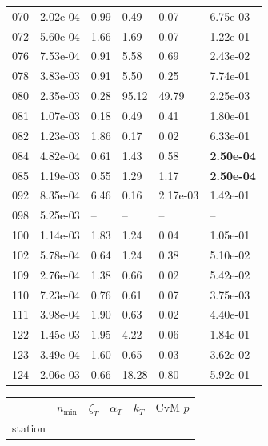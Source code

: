 \begin{figure}[htbp!]
{\begin{minipage}[t]{0.48\linewidth}
\begin{tabular}{llllll}
                    070 & 2.02e-04 & 0.99 & 0.49 & 0.07 & 6.75e-03\\
                    072 & 5.60e-04 & 1.66 & 1.69 & 0.07 & 1.22e-01\\
                    076 & 7.53e-04 & 0.91 & 5.58 & 0.69 & 2.43e-02\\
                    078 & 3.83e-03 & 0.91 & 5.50 & 0.25 & 7.74e-01\\
                    080 & 2.35e-03 & 0.28 & 95.12 & 49.79 & 2.25e-03\\
                    081 & 1.07e-03 & 0.18 & 0.49 & 0.41 & 1.80e-01\\
                    082 & 1.23e-03 & 1.86 & 0.17 & 0.02 & 6.33e-01\\
                    084 & 4.82e-04 & 0.61 & 1.43 & 0.58 & \textbf{2.50e-04}\\
                    085 & 1.19e-03 & 0.55 & 1.29 & 1.17 & \textbf{2.50e-04}\\
                    092 & 8.35e-04 & 6.46 & 0.16 & 2.17e-03 & 1.42e-01\\
                    098 & 5.25e-03 & -- & -- & -- & --\\
                    100 & 1.14e-03 & 1.83 & 1.24 & 0.04 & 1.05e-01\\
                    102 & 5.78e-04 & 0.64 & 1.24 & 0.38 & 5.10e-02\\
                    109 & 2.76e-04 & 1.38 & 0.66 & 0.02 & 5.42e-02\\
                    110 & 7.23e-04 & 0.76 & 0.61 & 0.07 & 3.75e-03\\
                    111 & 3.98e-04 & 1.90 & 0.63 & 0.02 & 4.40e-01\\
                    122 & 1.45e-03 & 1.95 & 4.22 & 0.06 & 1.84e-01\\
                    123 & 3.49e-04 & 1.60 & 0.65 & 0.03 & 3.62e-02\\
                    124 & 2.06e-03 & 0.66 & 18.28 & 0.80 & 5.92e-01\\
        \bottomrule
        \end{tabular}
    \end{minipage}
    \hspace{0.02\linewidth}
    \begin{minipage}[t]{0.48\linewidth}
        \centering
        \begin{tabular}{llllll}
        \toprule
         & $n_{\min}$ & $\zeta_T$ & $\alpha_T$ & $k_T$ & CvM $p$ \\
        station &  &  &  &  &  \\

\end{tabular}
\end{minipage}}
\end{figure}
